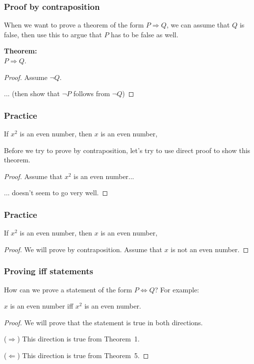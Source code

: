 \begin{frame}\frametitle{Proof by contraposition}
  When we want to prove a theorem of the form $P\Rightarrow Q$, we can
  assume that $Q$ is false, then use this to argue that $P$ has to be
  false as well.

  \begin{tcolorbox}[title=Proof by contraposition]
    {\bf Theorem:} \\
    $P\Rightarrow Q$.
    \begin{proof}
      Assume $\neg Q$.
      
      ... (then show that $\neg P$ follows from $\neg Q$)
    \end{proof}
  \end{tcolorbox}
\end{frame}

\begin{frame}\frametitle{Practice}
  \begin{theorem}
    If $x^2$ is an even number, then $x$ is an even number, 
  \end{theorem} \pause

  Before we try to prove by contraposition, let's try to use direct
  proof to show this theorem. \pause

  \begin{proof}
    Assume that $x^2$ is an even number...

    \vspace{1.2in} \pause

    ... doesn't seem to go very well.
  \end{proof}
\end{frame}

\begin{frame}\frametitle{Practice}
  \begin{theorem}
    If $x^2$ is an even number, then $x$ is an even number, 
  \end{theorem} \pause
  \begin{proof}
    We will prove by contraposition.  
    Assume that $x$ is not an even number.

    \vspace{1.5in}
  \end{proof}
\end{frame}

\begin{frame}\frametitle{Proving iff statements}
  How can we prove a statement of the form $P\Leftrightarrow Q$?  For example:
  \begin{theorem}
    $x$ is an even number iff $x^2$ is an even number.
  \end{theorem} \pause
  \begin{proof}
    We will prove that the statement is true in both directions.
    
    ($\Rightarrow$) This direction is true from Theorem~1.

    ($\Leftarrow$) This direction is true from Theorem~5.
  \end{proof}
\end{frame}

